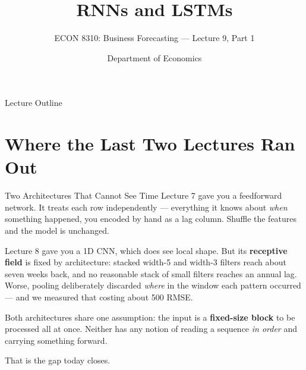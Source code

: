 \documentclass[aspectratio=169, 11pt]{beamer}
\title[RNNs \& LSTMs]{RNNs and LSTMs}
\subtitle{ECON 8310: Business Forecasting --- Lecture 9, Part 1}
\author{Department of Economics}
\institute{University of Nebraska at Omaha}
\begin{document}

\begin{frame}
  \titlepage
\end{frame}

\begin{frame}{Lecture Outline}
  \tableofcontents
\end{frame}

\section{Where the Last Two Lectures Ran Out}


\begin{frame}{Two Architectures That Cannot See Time}
  Lecture 7 gave you a feedforward network. It treats each row independently --- everything it
  knows about \emph{when} something happened, you encoded by hand as a lag column. Shuffle the
  features and the model is unchanged.

  \vspace{0.15cm}
  Lecture 8 gave you a 1D CNN, which does see local shape. But its \textbf{receptive field} is
  fixed by architecture: stacked width-5 and width-3 filters reach about seven weeks back, and no
  reasonable stack of small filters reaches an annual lag. Worse, pooling deliberately discarded
  \emph{where} in the window each pattern occurred --- and we measured that costing about 500 RMSE.

  \begin{keybox}
    Both architectures share one assumption: the input is a \textbf{fixed-size block} to be
    processed all at once. Neither has any notion of reading a sequence \emph{in order} and
    carrying something forward.
  \end{keybox}

  \vspace{0.1cm}
  That is the gap today closes.
\end{frame}
\end{document}
